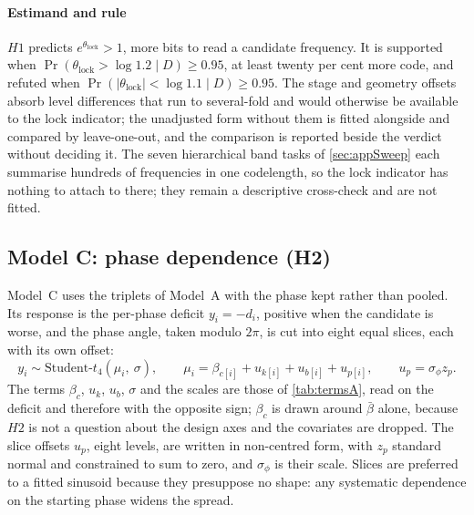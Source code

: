 

\paragraph{Estimand and rule} $H1$ predicts $e^{\theta_{\mathrm{lock}}}>1$, more bits to read a candidate frequency. It is supported when $\Pr(\theta_{\mathrm{lock}}>\log1.2\mid D)\ge0.95$, at least twenty per cent more code, and refuted when $\Pr(|\theta_{\mathrm{lock}}|<\log1.1\mid D)\ge0.95$. The stage and geometry offsets absorb level differences that run to several-fold and would otherwise be available to the lock indicator; the unadjusted form without them is fitted alongside and compared by leave-one-out, and the comparison is reported beside the verdict without deciding it. The seven hierarchical band tasks of \autoref{sec:appSweep} each summarise hundreds of frequencies in one codelength, so the lock indicator has nothing to attach to there; they remain a descriptive cross-check and are not fitted.

\subsection{Model {C}: phase dependence (H2)}

Model~C uses the triplets of Model~A with the phase kept rather than pooled. Its response is the per-phase deficit $y_i=-d_i$, positive when the candidate is worse, and the phase angle, taken modulo $2\pi$, is cut into eight equal slices, each with its own offset:
\begin{equation*}
y_i \sim \text{Student-}t_4(\mu_i,\ \sigma),
\qquad
\mu_i = \beta_{c[i]} + u_{k[i]} + u_{b[i]} + u_{p[i]},
\qquad
u_p = \sigma_\phi z_p .
\end{equation*}
The terms $\beta_c$, $u_k$, $u_b$, $\sigma$ and the scales are those of \autoref{tab:termsA}, read on the deficit and therefore with the opposite sign; $\beta_c$ is drawn around $\bar\beta$ alone, because $H2$ is not a question about the design axes and the covariates are dropped. The slice offsets $u_p$, eight levels, are written in non-centred form, with $z_p$ standard normal and constrained to sum to zero, and $\sigma_\phi$ is their scale. Slices are preferred to a fitted sinusoid because they presuppose no shape: any systematic dependence on the starting phase widens the spread.

